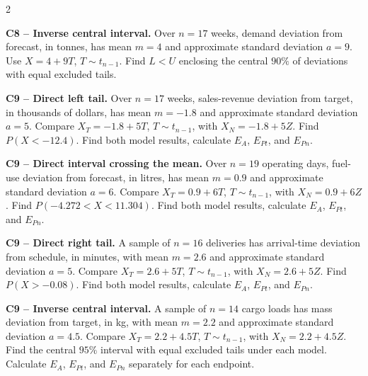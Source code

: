 \begin{multicols}{2}
\noindent\begin{minipage}{\linewidth}
\textbf{C8 -- Inverse central interval.} Over $n=17$ weeks, demand deviation from forecast, in tonnes, has mean $m=4$ and approximate standard deviation $a=9$. Use $X=4+9T$, $T\sim t_{n-1}$.
Find $L<U$ enclosing the central $90\%$ of deviations with equal excluded tails. 
\end{minipage}\par

\noindent\begin{minipage}{\linewidth}
\textbf{C9 -- Direct left tail.} Over $n=17$ weeks, sales-revenue deviation from target, in thousands of dollars, has mean $m=-1.8$ and approximate standard deviation $a=5$. Compare $X_T=-1.8+5T$, $T\sim t_{n-1}$, with $X_N=-1.8+5Z$.
Find $P(X<-12.4)$. Find both model results, calculate $E_A$, $E_{Pt}$, and $E_{Pn}$. 
\end{minipage}\par

\noindent\begin{minipage}{\linewidth}
\textbf{C9 -- Direct interval crossing the mean.} Over $n=19$ operating days, fuel-use deviation from forecast, in litres, has mean $m=0.9$ and approximate standard deviation $a=6$. Compare $X_T=0.9+6T$, $T\sim t_{n-1}$, with $X_N=0.9+6Z$.
Find $P(-4.272<X<11.304)$. Find both model results, calculate $E_A$, $E_{Pt}$, and $E_{Pn}$. 
\end{minipage}\par

\noindent\begin{minipage}{\linewidth}
\textbf{C9 -- Direct right tail.} A sample of $n=16$ deliveries has arrival-time deviation from schedule, in minutes, with mean $m=2.6$ and approximate standard deviation $a=5$. Compare $X_T=2.6+5T$, $T\sim t_{n-1}$, with $X_N=2.6+5Z$.
Find $P(X>-0.08)$. Find both model results, calculate $E_A$, $E_{Pt}$, and $E_{Pn}$. 
\end{minipage}\par

\noindent\begin{minipage}{\linewidth}
\textbf{C9 -- Inverse central interval.} A sample of $n=14$ cargo loads has mass deviation from target, in kg, with mean $m=2.2$ and approximate standard deviation $a=4.5$. Compare $X_T=2.2+4.5T$, $T\sim t_{n-1}$, with $X_N=2.2+4.5Z$.
Find the central $95\%$ interval with equal excluded tails under each model. Calculate $E_A$, $E_{Pt}$, and $E_{Pn}$ separately for each endpoint. 
\end{minipage}\par


\end{multicols}

